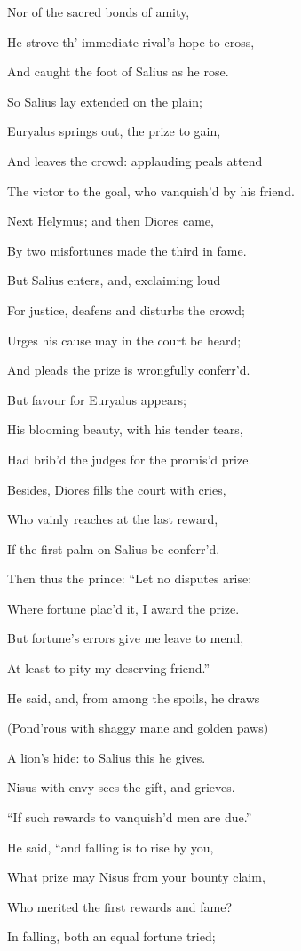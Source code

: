 Nor of the sacred bonds of amity,

He strove th’ immediate rival’s hope to cross,

And caught the foot of Salius as he rose.

So Salius lay extended on the plain;

Euryalus springs out, the prize to gain,

And leaves the crowd: applauding peals attend

The victor to the goal, who vanquish’d by his friend.

Next Helymus; and then Diores came,

By two misfortunes made the third in fame.

But Salius enters, and, exclaiming loud

For justice, deafens and disturbs the crowd;

Urges his cause may in the court be heard;

And pleads the prize is wrongfully conferr’d.

But favour for Euryalus appears;

His blooming beauty, with his tender tears,

Had brib’d the judges for the promis’d prize.

Besides, Diores fills the court with cries,

Who vainly reaches at the last reward,

If the first palm on Salius be conferr’d.

Then thus the prince: “Let no disputes arise:

Where fortune plac’d it, I award the prize.

But fortune’s errors give me leave to mend,

At least to pity my deserving friend.”

He said, and, from among the spoils, he draws

(Pond’rous with shaggy mane and golden paws)

A lion’s hide: to Salius this he gives.

Nisus with envy sees the gift, and grieves.

“If such rewards to vanquish’d men are due.”

He said, “and falling is to rise by you,

What prize may Nisus from your bounty claim,

Who merited the first rewards and fame?

In falling, both an equal fortune tried;

